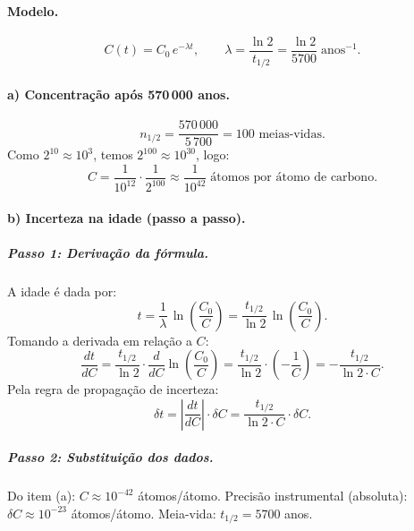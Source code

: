 \documentclass[12pt,a4paper]{article}
\theoremstyle{definition}
\newcommand{\resultado}[1]{%
  \begin{center}
    \fbox{\parbox{0.85\linewidth}{\centering $\displaystyle #1$}}
  \end{center}
}
\begin{document}
\paragraph{Modelo.}
\begin{equation}
  C(t) = C_0\,e^{-\lambda t}, \qquad \lambda = \frac{\ln 2}{t_{1/2}}
         = \frac{\ln 2}{5700}\;\text{anos}^{-1}.
\end{equation}

\paragraph{a) Concentra\c{c}\~ao ap\'os 570\,000 anos.}
\begin{equation}
  n_{1/2} = \frac{570\,000}{5\,700} = 100 \text{ meias-vidas}.
\end{equation}
Como $2^{10}\approx10^{3}$, temos $2^{100}\approx10^{30}$, logo:
\begin{equation}
  C = \frac{1}{10^{12}}\cdot\frac{1}{2^{100}} \approx \frac{1}{10^{42}}\;\text{\'atomos por \'atomo de carbono.}
\end{equation}
\resultado{C \approx 10^{-42}}

\paragraph{b) Incerteza na idade (passo a passo).}

\subparagraph{Passo 1: Deriva\c{c}\~ao da f\'ormula.}
A idade \'e dada por:
\begin{equation}
  t = \frac{1}{\lambda}\,\ln\left(\frac{C_0}{C}\right) = \frac{t_{1/2}}{\ln 2}\,\ln\left(\frac{C_0}{C}\right).
\end{equation}
Tomando a derivada em rela\c{c}\~ao a $C$:
\begin{equation}
  \frac{dt}{dC} = \frac{t_{1/2}}{\ln 2} \cdot \frac{d}{dC}\ln\left(\frac{C_0}{C}\right)
  = \frac{t_{1/2}}{\ln 2} \cdot \left(-\frac{1}{C}\right)
  = -\frac{t_{1/2}}{\ln 2 \cdot C}.
\end{equation}
Pela regra de propaga\c{c}\~ao de incerteza:
\begin{equation}
  \delta t = \left|\frac{dt}{dC}\right| \cdot \delta C = \frac{t_{1/2}}{\ln 2 \cdot C} \cdot \delta C.
\end{equation}

\subparagraph{Passo 2: Substitui\c{c}\~ao dos dados.}
Do item (a): $C \approx 10^{-42}$ \'atomos/\'atomo.
Precis\~ao instrumental (absoluta): $\delta C \approx 10^{-23}$ \'atomos/\'atomo.
Meia-vida: $t_{1/2} = 5700$ anos.
\end{document}
